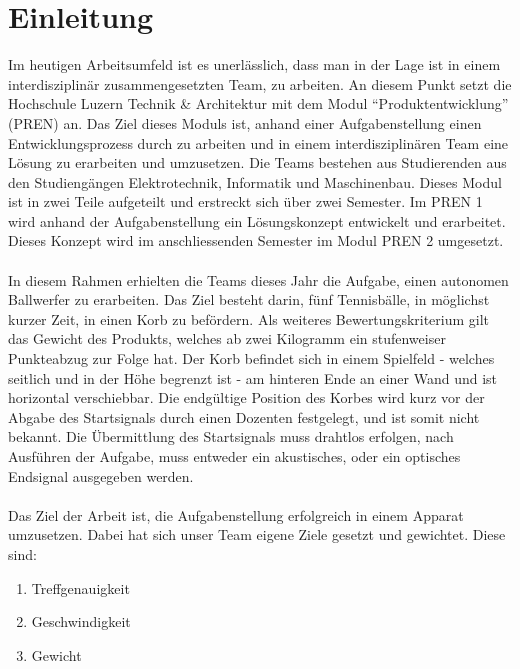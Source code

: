 ﻿\section{Einleitung}
Im heutigen Arbeitsumfeld ist es unerlässlich, dass man in der Lage ist in einem interdisziplinär zusammengesetzten Team, zu arbeiten. An diesem Punkt setzt die Hochschule Luzern Technik \& Architektur mit dem Modul \enquote{Produktentwicklung} (PREN) an. Das Ziel dieses Moduls ist, anhand einer Aufgabenstellung einen Entwicklungsprozess durch zu arbeiten und in einem interdisziplinären Team eine Lösung zu erarbeiten und umzusetzen. Die Teams bestehen aus Studierenden aus den Studiengängen Elektrotechnik, Informatik und Maschinenbau. Dieses Modul ist in zwei Teile aufgeteilt und erstreckt sich über zwei Semester. Im PREN 1 wird anhand der Aufgabenstellung ein Lösungskonzept entwickelt und erarbeitet. Dieses Konzept wird im anschliessenden Semester im Modul PREN 2 umgesetzt.\\
\\
In diesem Rahmen erhielten die Teams dieses Jahr die Aufgabe, einen autonomen Ballwerfer zu erarbeiten. Das Ziel besteht darin, fünf Tennisbälle, in möglichst kurzer Zeit, in einen Korb zu befördern. Als weiteres Bewertungskriterium gilt das Gewicht des Produkts, welches ab zwei Kilogramm ein stufenweiser Punkteabzug zur Folge hat. Der Korb befindet sich in einem Spielfeld - welches seitlich und in der Höhe begrenzt ist - am hinteren Ende an einer Wand und ist horizontal verschiebbar. Die endgültige Position des Korbes wird kurz vor der Abgabe des Startsignals durch einen Dozenten festgelegt, und ist somit nicht bekannt. Die Übermittlung des Startsignals muss drahtlos erfolgen, nach Ausführen der Aufgabe, muss entweder ein akustisches, oder ein optisches Endsignal ausgegeben werden.\\
\\
Das Ziel der Arbeit ist, die Aufgabenstellung erfolgreich in einem Apparat umzusetzen. Dabei hat sich unser Team eigene Ziele gesetzt und gewichtet. Diese sind:
\begin{enumerate}
    \item Treffgenauigkeit
    \item Geschwindigkeit
    \item Gewicht
\end{enumerate}
